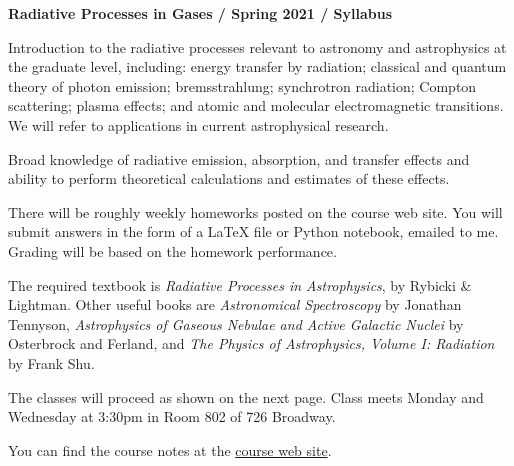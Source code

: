 \documentclass[11pt]{article}
\begin{document}
\begin{center}
  {\bf Radiative Processes in Gases / Spring 2021 / Syllabus }
\end{center}


 Introduction to the radiative
processes relevant to astronomy and astrophysics at the graduate
level, including: energy transfer by radiation; classical and quantum
theory of photon emission; bremsstrahlung; synchrotron radiation;
Compton scattering; plasma effects; and atomic and molecular
electromagnetic transitions.  We will refer to applications in current
astrophysical research.

 Broad knowledge of radiative
emission, absorption, and transfer effects and ability to perform
theoretical calculations and estimates of these effects.

 There will be roughly weekly homeworks
posted on the course web site.  You will submit answers in the form of
a LaTeX file or Python notebook, emailed to me. Grading will be based
on the homework performance.

 The required textbook is {\it Radiative
  Processes in Astrophysics}, by Rybicki \& Lightman. Other useful
books are {\it Astronomical Spectroscopy} by Jonathan Tennyson, {\it
  Astrophysics of Gaseous Nebulae and Active Galactic Nuclei} by
Osterbrock and Ferland, and {\it The Physics of Astrophysics, Volume
  I: Radiation} by Frank Shu.

\noindent The classes will proceed as shown on the next page.  Class
meets Monday and Wednesday at 3:30pm in Room 802 of 726 Broadway.

\noindent You can find the course notes at the
\href{http://blanton144.github.io/radiative}{course web site}. 

\end{document}
